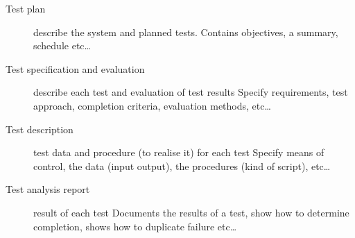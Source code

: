 \begin{description}
    \item[Test plan] describe the system and planned tests.
        \subitem{} Contains objectives, a summary, schedule etc\ldots
    \item[Test specification and evaluation] describe each test and evaluation of test results
        \subitem{} Specify requirements, test approach, completion criteria, evaluation methods, etc\ldots
    \item[Test description] test data and procedure (to realise it) for each test
        \subitem{} Specify means of control, the data (input output), the procedures (kind of script), etc\ldots
    \item[Test analysis report] result of each test
        \subitem{} Documents the results of a test, show how to determine completion, shows how to duplicate failure etc\ldots
\end{description}
